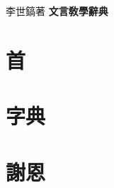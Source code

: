 \documentclass[a5paper,12pt]{book}
\begin{document}
\begin{titlepage}
\textcolor{wh}
\hfill
\vfill
\hspace{-40mm}
\vfill
{\fontsize{4mm}{4mm}\selectfont\textcolor{wh}{李世鎬\hspace{10mm}著}}
\vspace{24pt}\newline
{\fontsize{12mm}{12mm}\bfseries\selectfont\textcolor{wh}{\hspace{10mm}文言敎學辭典}}
\vfill
\end{titlepage}
\newpage
\chapter*{首}
\onehalfspacing
\flushleft

\chapter*{字典}
\onehalfspacing
\flushleft

\chapter*{謝恩}
\onehalfspacing
\flushleft

\end{document}
